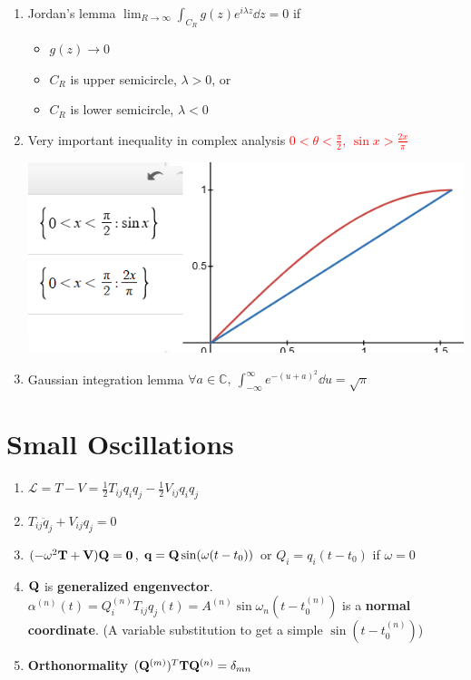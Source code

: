 \documentclass{article}
\theoremstyle{remark}
\theoremstyle{remark}
\begin{document}
\begin{enumerate}
\begin{itemize}
            \end{itemize}
        \item Jordan's lemma $\lim_{R\rightarrow\infty}\int_{C_R}g(z)e^{i\lambda z}\dd z=0$ if \begin{itemize}
                \item $g(z)\rightarrow0$
                \item $C_R$ is upper semicircle, $\lambda>0$, or
                \item $C_R$ is lower semicircle, $\lambda<0$
            \end{itemize}
        \item Very important inequality in complex analysis \textcolor{red}{$0<\theta<\frac{\pi}{2}$, $\sin x>\frac{2x}{\pi}$}
            \begin{center}
                \includegraphics*[width=0.4\linewidth]{complex_analysis_inequality.png}
            \end{center}
        \item Gaussian integration lemma $\forall a\in\mathbb{C},\ \int_{-\infty}^{\infty}e^{-(u+a)^2}\dd u=\sqrt{\pi}$
    \end{enumerate}
\section*{Small Oscillations}
    \begin{enumerate}
        \item $\mathcal{L}=T-V=\frac{1}{2}T_{ij}q_iq_j-\frac{1}{2}V_{ij}q_iq_j$
        \item $T_{ij}\ddot{q}_j+V_{ij}q_j=0$
        \item $(-\omega^2\vb{T}+\vb{V})\vb{Q}=\vb{0}$, $\vb{q}=\vb{Q}\sin(\omega(t-t_0))$ or $Q_i=q_i(t-t_0)$ if $\omega=0$
        \item $\vb{Q}$ is \textbf{generalized engenvector}. $\alpha^{(n)}(t) = Q^{(n)}_iT_{ij}q_j(t)=A^{(n)}\sin\omega_n(t-t_0^{(n)})$ is a \textbf{normal coordinate}. (A variable substitution to get a simple $\textstyle\sin(t-t_0^{(n)})$)
        \item \textbf{Orthonormality} $(\vb{Q}^{(m)})^T\vb{T}\vb{Q}^{(n)}=\delta_{mn}$
    \end{enumerate}
\end{document}

